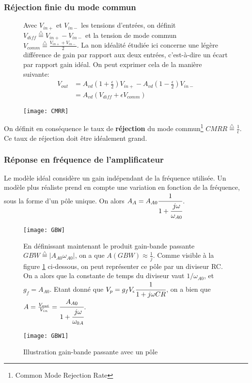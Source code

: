 \subsubsection*{Réjection finie du mode commun}
\begin{figure}[H]
\begin{minipage}{.65\linewidth}
Avec $V_{in+}$ et $V_{in-}$ les tensions d'entrées, on définit $V_{diff} \stackrel{\triangle}{=} V_{in+} - V_{in-}$ et la tension de mode commun $V_{comm}\stackrel{\triangle}{=} \frac{V_{in+} + V_{in-}}{2}$. La non idéalité étudiée ici concerne une légère différence de gain par rapport aux deux entrées, c'est-à-dire un écart par rapport gain idéal. On peut exprimer cela de la manière suivante: \begin{align*}
V_{out} &= A_{vd}(1 +\frac{\epsilon}{2})V_{in+} - A_{vd}(1-\frac{\epsilon}{2})V_{in-}\\
&= A_{vd}(V_{diff} + \epsilon V_{comm})
\end{align*}
\end{minipage}
\begin{minipage}{.35\linewidth}
\texttt{[image: CMRR]}
\end{minipage}
\end{figure}
On définit en conséquence le taux de \textbf{réjection} du mode commun\footnote{Common Mode Rejection Rate} $CMRR \stackrel{\triangle}{=} \frac{1}{\epsilon}$. Ce taux de réjection doit être idéalement grand.

\subsubsection*{Réponse en fréquence de l'amplificateur}
Le modèle idéal considère un gain indépendant de la fréquence utilisée. Un modèle plus réaliste prend en compte une variation en fonction de la fréquence, sous la forme d'un pôle unique. On alors $A_A = A_{A0}\cfrac{1}{1 + \cfrac{j\omega}{\omega_{A0}}}$.

\begin{figure}[H]
\begin{minipage}{.3\linewidth}
\texttt{[image: GBW]}
\end{minipage}
\begin{minipage}{.7\linewidth}
En définissant maintenant le produit gain-bande passante $GBW \stackrel{\triangle}{=} |A_{A0}\omega_{A0}|$, on a que $A(GBW) \approx \frac{1}{j}$.
Comme visible à la figure \ref{GBW} ci-dessous, on peut représenter ce pôle par un diviseur RC. On a alors que la constante de temps du diviseur vaut $1/\omega_{A0}$, et $g_f = A_{A0}$. Etant donné que $V_p = g_fV_{\epsilon}\cfrac{1}{1+j\omega CR}$, on a bien que $A = \frac{V_{out}}{V_{in}} = \cfrac{A_{A0}}{1+\cfrac{j\omega}{\omega_{0A}}}$.
\end{minipage}
\end{figure}
\begin{figure}[H]
\centering
\texttt{[image: GBW1]}
\caption{Illustration gain-bande passante avec un pôle}
\label{GBW}
\end{figure}


